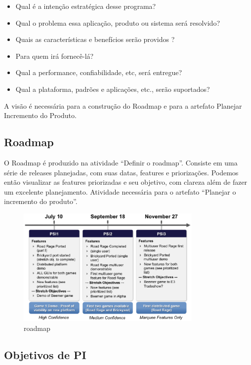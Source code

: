   \begin{itemize}

    \item Qual é a intenção estratégica desse programa?
    \item Qual o problema essa aplicação, produto ou sistema será resolvido?
    \item Quais as características e benefícios serão providos ?
    \item Para quem irá fornecê-lá?
    \item Qual a performance, confiabilidade, etc, será entregue?
    \item Qual a plataforma, padrões e aplicações, etc., serão suportados?

  \end{itemize}

  A visão é necessária para a construção do Roadmap e para a artefato Planejar Incremento do Produto.

\subsection {Roadmap}

  O Roadmap é produzido na atividade “Definir o roadmap”. Consiste em uma série de releases planejadas, com suas datas, features e priorizações. Podemos então visualizar as features priorizadas e seu objetivo, com clareza além de fazer um excelente planejamento. Atividade necessária  para o artefato “Planejar o incremento do produto”.

  \begin{figure}[!htb]
    \centering
    \includegraphics[width=9cm]{figuras/requisitos/roadmap.eps}
    \caption{roadmap}
  \end{figure}

\subsection {Objetivos de PI}
  
